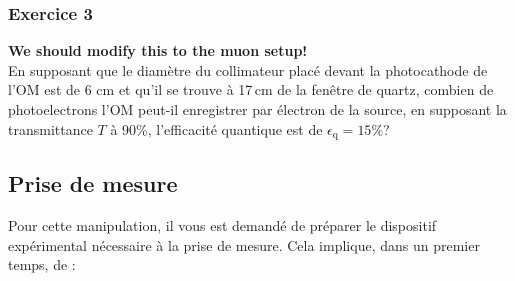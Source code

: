 \subsubsection{Exercice 3}
\textbf{We should modify this to the muon setup!}\\
En supposant que le diam\`etre du collimateur plac\'e devant la photocathode de l'OM est de 6 cm et qu'il se trouve \`a 17\,cm de la fen\^etre de quartz, combien de photoelectrons l'OM peut-il enregistrer par \'electron de la source, en supposant la transmittance $T$ \`a 90\%, l'efficacit\'e quantique est de $\epsilon_\mathrm{q}=15\%$?


\subsection{Prise de mesure}

Pour cette manipulation, il vous est demandé de préparer le dispositif expérimental nécessaire à la prise de mesure. Cela implique, dans un premier temps, de :\\

\begin{center}
\end{center}

